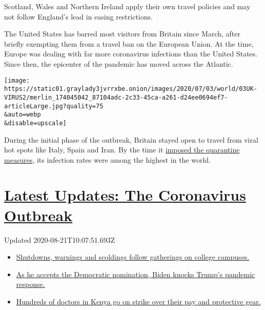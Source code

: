 Scotland, Wales and Northern Ireland apply their own travel policies and
may not follow England's lead in easing restrictions.

The United States has barred most visitors from Britain since March,
after briefly exempting them from a travel ban on the European Union. At
the time, Europe was dealing with far more coronavirus infections than
the United States. Since then, the epicenter of the pandemic has moved
across the Atlantic.

\texttt{[image: https://static01.graylady3jvrrxbe.onion/images/2020/07/03/world/03UK-VIRUS2/merlin\_174045042\_87104adc-2c33-45ca-a261-d24ee0694ef7-articleLarge.jpg?quality=75\\\&auto=webp\\\&disable=upscale]}

During the initial phase of the outbreak, Britain stayed open to travel
from viral hot spots like Italy, Spain and Iran. By the time it
\href{https://www.nytimes3xbfgragh.onion/2020/06/08/world/europe/uk-quarantine-johnson.html}{imposed
the quarantine measures}, its infection rates were among the highest in
the world.

\hypertarget{latest-updates-the-coronavirus-outbreak}{%
\section{\texorpdfstring{\href{https://www.nytimes3xbfgragh.onion/2020/08/21/world/covid-19-coronavirus.html?action=click\&pgtype=Article\&state=default\&region=MAIN_CONTENT_1\&context=storylines_live_updates}{Latest
Updates: The Coronavirus
Outbreak}}{Latest Updates: The Coronavirus Outbreak}}\label{latest-updates-the-coronavirus-outbreak}}

Updated 2020-08-21T10:07:51.693Z

\begin{itemize}
\tightlist
\item
  \href{https://www.nytimes3xbfgragh.onion/2020/08/21/world/covid-19-coronavirus.html?action=click\&pgtype=Article\&state=default\&region=MAIN_CONTENT_1\&context=storylines_live_updates\#link-4690b6aa}{Shutdowns,
  warnings and scoldings follow gatherings on college campuses.}
\item
  \href{https://www.nytimes3xbfgragh.onion/2020/08/21/world/covid-19-coronavirus.html?action=click\&pgtype=Article\&state=default\&region=MAIN_CONTENT_1\&context=storylines_live_updates\#link-324af071}{As
  he accepts the Democratic nomination, Biden knocks Trump's pandemic
  response.}
\item
  \href{https://www.nytimes3xbfgragh.onion/2020/08/21/world/covid-19-coronavirus.html?action=click\&pgtype=Article\&state=default\&region=MAIN_CONTENT_1\&context=storylines_live_updates\#link-35890b73}{Hundreds
  of doctors in Kenya go on strike over their pay and protective gear.}
\end{itemize}

